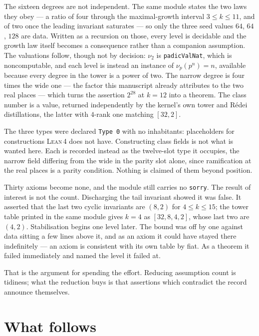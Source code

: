 \documentclass[12pt,a4paper]{article}
\newcommand{\Lean}{\textsc{Lean\,4}}
\begin{document}
The sixteen degrees are not independent. The same module states the two laws
they obey --- a ratio of four through the maximal-growth interval $3\le k\le11$,
and of two once the leading invariant saturates --- so only the three seed
values $64$, $64$, $128$ are data. Written as a recursion on those, every level
is decidable and the growth law itself becomes a consequence rather than a
companion assumption. The valuations follow, though not by decision:
$\nu_2$ is \texttt{padicValNat}, which is noncomputable, and each level is
instead an instance of $\nu_p(p^n)=n$, available because every degree in the
tower is a power of two. The narrow degree is four times the wide one --- the
factor this manuscript already attributes to the two real places --- which
turns the assertion $2^{28}$ at $k=12$ into a theorem. The class number is a
value, returned independently by the kernel's own tower and R\'edei
distillations, the latter with $4$-rank one matching $[32,2]$.

The three types were declared \texttt{Type 0} with no inhabitants: placeholders
for constructions \Lean{} does not have. Constructing class fields is not what
is wanted here. Each is recorded instead as the twelve-slot type it occupies,
the narrow field differing from the wide in the parity slot alone, since
ramification at the real places is a parity condition. Nothing is claimed of
them beyond position.

Thirty axioms become none, and the module still carries no \texttt{sorry}.
The result of interest is not the count. Discharging the tail invariant showed
it was false. It asserted that the last two cyclic invariants are $(8,2)$ for
$4\le k\le 15$; the tower table printed in the same module gives $k=4$ as
$[32,8,4,2]$, whose last two are $(4,2)$. Stabilisation begins one level later.
The bound was off by one against data sitting a few lines above it, and as an
axiom it could have stayed there indefinitely --- an axiom is consistent with
its own table by fiat. As a theorem it failed immediately and named the level
it failed at.

That is the argument for spending the effort. Reducing assumption count is
tidiness; what the reduction buys is that assertions which contradict the
record announce themselves.

\section{What follows}
\label{sec:follows}
\end{document}
